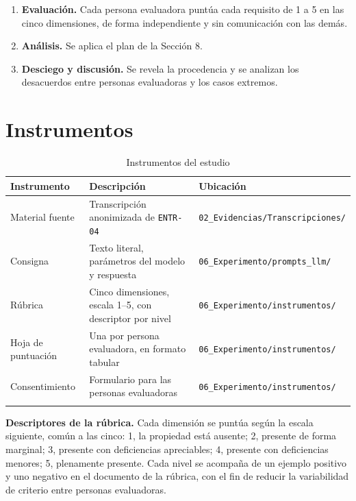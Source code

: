 \documentclass[11pt,a4paper]{article}
\newcommand{\id}[1]{\texttt{#1}}
\begin{document}
\begin{enumerate}[leftmargin=1.8em]
  \item \textbf{Evaluación.} Cada persona evaluadora puntúa cada requisito de 1 a 5 en las cinco
        dimensiones, de forma independiente y sin comunicación con las demás.

  \item \textbf{Análisis.} Se aplica el plan de la Sección 8.

  \item \textbf{Desciego y discusión.} Se revela la procedencia y se analizan los desacuerdos entre
        personas evaluadoras y los casos extremos.
\end{enumerate}

\section{Instrumentos}

\begin{longtable}{|C{2.6cm}|L{5.0cm}|L{6.8cm}|}
\hline
{}\textbf{Instrumento} & \textbf{Descripción} & \textbf{Ubicación} \\
\hline
\endhead
Material fuente & Transcripción anonimizada de \id{ENTR-04} & \id{02\_Evidencias/Transcripciones/} \\ \hline
Consigna & Texto literal, parámetros del modelo y respuesta & \id{06\_Experimento/prompts\_llm/} \\ \hline
Rúbrica & Cinco dimensiones, escala 1--5, con descriptor por nivel & \id{06\_Experimento/instrumentos/} \\ \hline
Hoja de puntuación & Una por persona evaluadora, en formato tabular & \id{06\_Experimento/instrumentos/} \\ \hline
Consentimiento & Formulario para las personas evaluadoras & \id{06\_Experimento/instrumentos/} \\ \hline
\caption{Instrumentos del estudio}
\end{longtable}

\noindent
\textbf{Descriptores de la rúbrica.} Cada dimensión se puntúa según la escala siguiente, común a las
cinco: 1, la propiedad está ausente; 2, presente de forma marginal; 3, presente con deficiencias
apreciables; 4, presente con deficiencias menores; 5, plenamente presente. Cada nivel se acompaña de
un ejemplo positivo y uno negativo en el documento de la rúbrica, con el fin de reducir la
variabilidad de criterio entre personas evaluadoras.

\end{document}
